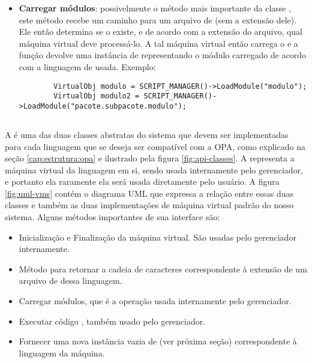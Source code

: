 \begin{itemize}
    \item \textbf{Carregar módulos}: possivelmente o método mais importante da classe \SMgr{}, este
      método recebe um caminho para um arquivo de \script{} (sem a extensão dele). Ele então determina
      se o \script{} existe, e de acordo com a extensão do arquivo, qual máquina virtual deve processá-lo.
      A tal máquina virtual então carrega o \script{} e a função devolve uma instância de \VObj{}
      representando o módulo carregado de acordo com a linguagem de \script{} usada. Exemplo:
      \begin{lstlisting}
        VirtualObj modulo = SCRIPT_MANAGER()->LoadModule("modulo");
        VirtualObj modulo2 = SCRIPT_MANAGER()->LoadModule("pacote.subpacote.modulo");
      \end{lstlisting}

  \end{itemize}

  \subsection{\VMac{}}
  \label{sec:atividades:opa:vmac}
  A \VMac{} é uma das duas classes abstratas do sistema que devem ser implementadas para
  cada linguagem que se deseja ser compatível com a OPA, como explicado na seção
  \ref{cap:estrutura:opa} e ilustrado pela figura \ref{fig:api-classes}.
  A \VMac{} representa a máquina virtual da linguagem em si, sendo usada internamente pelo 
  gerenciador, e portanto ela raramente ela será usada diretamente pelo usuário. A figura
  \ref{fig:uml-vms} contém o diagrama UML que expressa a relação entre essas duas classes
  e também as duas implementações de máquina virtual padrão do nosso sistema. Alguns
  métodos importantes de sua interface são:
  
  \begin{itemize}
    \item Inicialização e Finalização da máquina virtual. São usadas pelo gerenciador internamente.
    \item Método para retornar a cadeia de caracteres correspondente à extensão de um 
      arquivo de \script{} dessa linguagem.
    \item Carregar módulos, que é a operação usada internamente pelo gerenciador.
    \item Executar código \script{}, também usado pelo gerenciador.
    \item Fornecer uma nova instância vazia de \VData{} (ver próxima seção) correspondente à
      linguagem da máquina.
  \end{itemize}

